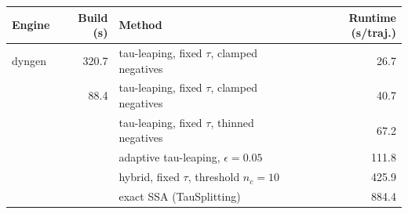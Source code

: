 \begin{tabular}{lr|lr}
\hline
\textbf{Engine} & \textbf{Build (s)} & \textbf{Method} & \textbf{Runtime (s/traj.)} \\
\hline
dyngen & 320.7 & tau-leaping, fixed $\tau$, clamped negatives & 26.7 \\
\hline
\thetool{} & 88.4 & tau-leaping, fixed $\tau$, clamped negatives & 40.7 \\
 &  & tau-leaping, fixed $\tau$, thinned negatives & 67.2 \\
 &  & adaptive tau-leaping, $\epsilon = 0.05$ & 111.8 \\
 &  & hybrid, fixed $\tau$, threshold $n_c = 10$ & 425.9 \\
 &  & exact SSA (TauSplitting) & 884.4 \\
\hline
\end{tabular}
